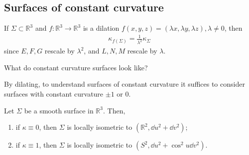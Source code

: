 \subsection{Surfaces of constant curvature}
If $\Sigma \subset \mathbb{R}^3$ and $f \colon \mathbb R^3 \to \mathbb R^3$ is a dilation $f(x,y,z) = (\lambda x,\lambda y,\lambda z), \lambda \neq 0$, then
\begin{align*}
	\kappa_{f(\Sigma)} = \frac{1}{\lambda^2} \kappa_\Sigma
\end{align*}
since $E, F, G$ rescale by $\lambda^2$, and $L, N, M$ rescale by $\lambda$.

\begin{question}
	What do constant curvature surfaces look like?
\end{question} 

\begin{answer}
	By dilating, to understand surfaces of constant curvature it suffices to consider surfaces with constant curvature $\pm 1$ or 0.
\end{answer} 

\begin{proposition} \label{prp:3.7}
	Let $\Sigma$ be a smooth surface in $\mathbb R^3$.
	Then,
	\begin{enumerate}
		\item if $\kappa \equiv 0$, then $\Sigma$ is locally isometric to $(\mathbb R^2, \dd{u^2} + \dd{v}^2)$;
		\item if $\kappa \equiv 1$, then $\Sigma$ is locally isometric to $(S^2, \dd{u}^2 + \cos^2 u \dd{v}^2)$.
	\end{enumerate}
\end{proposition}

